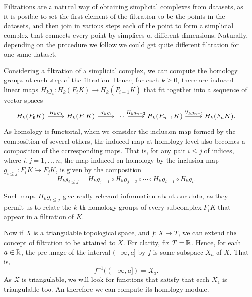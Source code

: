 Filtrations are a natural way of obtaining simplicial complexes from datasets, as it is posible to set the first element of the filtration to be the points in the datasets, and then join in various steps each of the point to form a simplicial complex that connects every point by simplices of different dimensions. Naturally, depending on the procedure we follow we could get quite different filtration for one same dataset.

Considering a filtration of a simplicial complex, we can compute the homology groups at each step of the filtration. Hence, for each $ k \geq 0 $, there are induced linear maps $ H_kg_i \colon H_k(F_iK) \to H_k(F_{i+1}K) $ that fit together into a sequence of vector spaces
\begin{equation}
\begin{tikzcd}
    H_k(F_0K) \arrow[r, "H_kg_0"] & H_k(F_1K) \arrow[r, "H_kg_1"] & \cdots \arrow[r, "H_kg_{n-2}"] & H_k(F_{n-1}K) \arrow[r, "H_kg_{n-1}"] & H_k(F_nK).
\end{tikzcd}
\end{equation}
As homology is functorial, when we consider the inclusion map formed by the composition of several others, the induced map at homology level also becomes a composition of the corresponding maps. That is, for any pair $ i \leq j $ of indices, where $ i, j = 1, \dots, n $, the map induced on homology by the inclusion map $ g_{i \leq j} \colon F_i K \hookrightarrow F_j K $, is given by the composition
\begin{equation}
    H_k g_{i \leq j} = H_k g_{j-1} \circ H_k g_{j-2} \circ \cdots \circ H_k g_{i+1} \circ H_k g_i.
\end{equation}

Such maps $ H_k g_{i \leq j} $ give really relevant information about our data, as they permit us to relate the $k$-th homology groups of every subcomplex $ F_i K $ that appear in a filtration of $ K $.

Now if $ X $ is a triangulable topological space, and $ f \colon X \to T $, we can extend the concept of filtration to be attained to $ X $. For clarity, fix $ T = \mathbb R $. Hence, for each $ a \in \mathbb R $, the pre image of the interval $(-\infty, a] $ by $ f $ is some subspace $ X_a $ of $ X $. That is,
\begin{equation}
    f^{-1}((-\infty, a]) = X_a.
\end{equation}
As $ X $ is triangulable, we will look for functions that satisfy that each $ X_a $ is triangulable too. An therefore we can compute its homology module.

